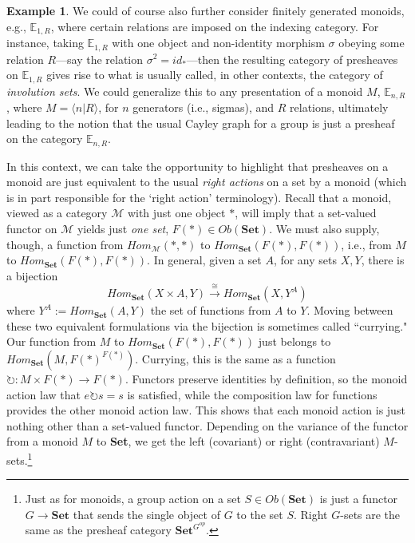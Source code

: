 \documentclass[a4paper]{book}
\theoremstyle{definition}
\newtheorem{example}{Example}[section]
\theoremstyle{definition}
\theoremstyle{definition}
\theoremstyle{theorem}
\theoremstyle{definition}
\begin{document}
\begin{example}
		We could of course also further consider finitely generated monoids, e.g., $\mathbb{E}_{1,R}$, where certain relations are imposed on the indexing category. For instance, taking $\mathbb{E}_{1,R}$ with one object and non-identity morphism $\sigma$ obeying some relation $R$---say the relation $\sigma^2 = id_*$---then the resulting category of presheaves on $\mathbb{E}_{1,R}$ gives rise to what is usually called, in other contexts, the category of \textit{involution sets}. We could generalize this to any presentation of a monoid $M$, $\mathbb{E}_{n,R}$, where $M = \langle n | R \rangle$, for $n$ generators (i.e., sigmas), and $R$ relations, ultimately leading to the notion that the usual Cayley graph for a group is just a presheaf on the category $\mathbb{E}_{n, R}$.\par 
		In this context, we can take the opportunity to highlight that presheaves on a monoid are just equivalent to the usual \textit{right actions} on a set by a monoid (which is in part responsible for the `right action' terminology). Recall that a monoid, viewed as a category $\mathcal{M}$ with just one object $*$, will imply that a set-valued functor on $\mathcal{M}$ yields just \textit{one set}, $F(*) \in Ob(\textbf{Set})$. We must also supply, though, a function from $Hom_{\mathcal{M}}(*,*)$ to $Hom_{\textbf{Set}}(F(*), F(*))$, i.e., from $M$ to $Hom_{\textbf{Set}}(F(*), F(*))$. In general, given a set $A$, for any sets $X, Y$, there is a bijection 
		\begin{equation*}
		Hom_{\textbf{Set}}(X \times A, Y) \xrightarrow{\cong} Hom_{\textbf{Set}}(X, Y^A)
		\end{equation*} where $Y^A := Hom_{\textbf{Set}}(A, Y)$ the set of functions from $A$ to $Y$. Moving between these two equivalent formulations via the bijection is sometimes called ``currying." Our function from $M$ to $Hom_{\textbf{Set}}(F(*), F(*))$ just belongs to $Hom_{\textbf{Set}}(M, F(*)^{F(*)})$. Currying, this is the same as a function $\circlearrowright: M \times F(*) \rightarrow F(*)$. Functors preserve identities by definition, so the monoid action law that $e \circlearrowright s = s$ is satisfied, while the composition law for functions provides the other monoid action law. This shows that each monoid action is just nothing other than a set-valued functor. Depending on the variance of the functor from a monoid $M$ to \textbf{Set}, we get the left (covariant) or right (contravariant) $M$-sets.\footnote{Just as for monoids, a group action on a set $S \in Ob(\textbf{Set})$ is just a functor $G \rightarrow \textbf{Set}$ that sends the single object of $G$ to the set $S$. Right $G$-sets are the same as the presheaf category $\textbf{Set}^{G^{op}}$.} \par 

\end{example}
\end{document}
